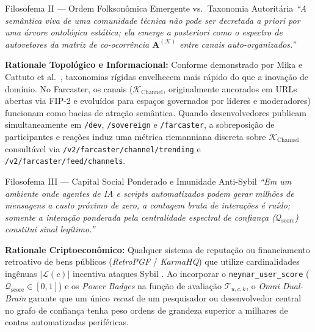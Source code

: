 \documentclass[11pt,a4paper]{article}
\begin{document}
\begin{filosofema}{Filosofema II --- Ordem Folksonômica Emergente vs.\ Taxonomia Autoritária}
\emph{``A semântica viva de uma comunidade técnica não pode ser decretada a priori por uma árvore ontológica estática; ela emerge a posteriori como o espectro de autovetores da matriz de co-ocorrência $\mathbf{A}^{(\mathcal{K})}$ entre canais auto-organizados.''}

\medskip
\noindent\textbf{Rationale Topológico e Informacional:}
Conforme demonstrado por Mika \cite{mika2005} e Cattuto et al.\ \cite{cattuto2007network}, taxonomias rígidas envelhecem mais rápido do que a inovação de domínio. No Farcaster, os canais ($\mathcal{K}_{\text{Channel}}$, originalmente ancorados em URLs abertas via FIP-2 e evoluídos para espaços governados por líderes e moderadores) funcionam como bacias de atração semântica. Quando desenvolvedores publicam simultaneamente em \texttt{/dev}, \texttt{/sovereign} e \texttt{/farcaster}, a sobreposição de participantes e reações induz uma métrica riemanniana discreta sobre $\mathcal{K}_{\text{Channel}}$ consultável via \texttt{/v2/farcaster/channel/trending} e \texttt{/v2/farcaster/feed/channels}.
\end{filosofema}

\begin{filosofema}{Filosofema III --- Capital Social Ponderado e Imunidade Anti-Sybil}
\emph{``Em um ambiente onde agentes de IA e scripts automatizados podem gerar milhões de mensagens a custo próximo de zero, a contagem bruta de interações é ruído; somente a interação ponderada pela centralidade espectral de confiança ($\mathcal{Q}_{\text{score}}$) constitui sinal legítimo.''}

\medskip
\noindent\textbf{Rationale Criptoeconômico:}
Qualquer sistema de reputação ou financiamento retroativo de bens públicos (\emph{RetroPGF} / \emph{KarmaHQ}) que utilize cardinalidades ingênuas $|\mathcal{L}(c)|$ incentiva ataques Sybil \cite{kamvar2003eigentrust,buterin2022decentralized}. Ao incorporar o \texttt{neynar\_user\_score} ($\mathcal{Q}_{\text{score}} \in [0,1]$) e os \emph{Power Badges} na função de avaliação $\mathcal{T}_{u,c,k}$, o \emph{Omni Dual-Brain} garante que um único \emph{recast} de um pesquisador ou desenvolvedor central no grafo de confiança tenha peso ordens de grandeza superior a milhares de contas automatizadas periféricas.
\end{filosofema}
\end{document}
